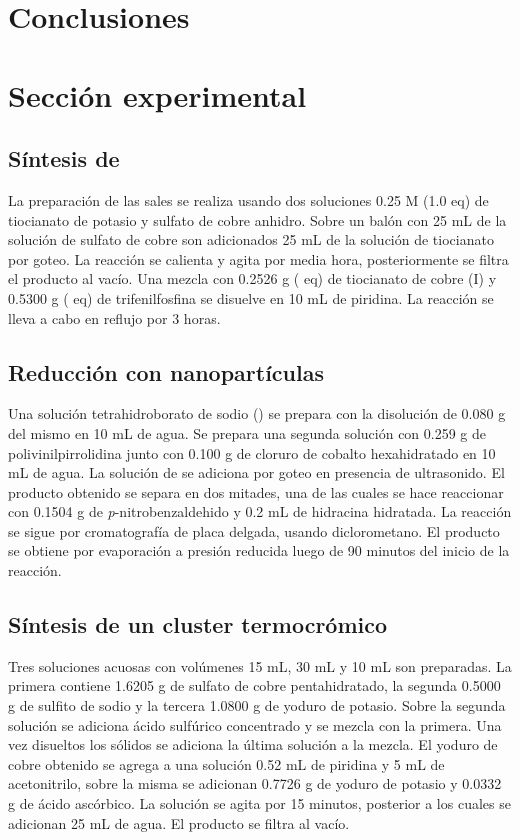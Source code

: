 \documentclass[fleqn,10pt]{SelfArx}
\begin{document}
\section{Conclusiones}

\section{Secci\'on experimental}
\subsection{S\'intesis de }
La preparaci\'on de las sales se realiza usando dos soluciones 0.25 M (1.0 eq) de tiocianato de potasio y sulfato de cobre anhidro. Sobre un bal\'on con 25 mL de la soluci\'on de sulfato de cobre son adicionados 25 mL de la soluci\'on de tiocianato por goteo. La reacci\'on se calienta y agita por media hora, posteriormente se filtra el producto al vac\'io. Una mezcla con 0.2526 g ( eq) de tiocianato de cobre (I) y 0.5300 g ( eq) de trifenilfosfina se disuelve en 10 mL de piridina. La reacci\'on se lleva a cabo en reflujo por 3 horas.

\subsection{Reducci\'on con nanopart\'iculas}
Una soluci\'on tetrahidroborato de sodio () se prepara con la disoluci\'on de 0.080 g del mismo en 10 mL de agua. Se prepara una segunda soluci\'on con 0.259 g de polivinilpirrolidina junto con 0.100 g de cloruro de cobalto hexahidratado en 10 mL de agua. La soluci\'on de  se adiciona por goteo en presencia de ultrasonido. El producto obtenido se separa en dos mitades, una de las cuales se hace reaccionar con 0.1504 g de \textit{p}-nitrobenzaldehido y 0.2 mL de hidracina hidratada. La reacci\'on se sigue por cromatograf\'ia de placa delgada, usando diclorometano. El producto se obtiene por evaporaci\'on a presi\'on reducida luego de 90 minutos del inicio de la reacci\'on.

\subsection{S\'intesis de un cluster termocr\'omico}
Tres soluciones acuosas con vol\'umenes 15 mL, 30 mL y 10 mL son preparadas. La primera contiene 1.6205 g de sulfato de cobre pentahidratado, la segunda 0.5000 g de sulfito de sodio y la tercera 1.0800 g de yoduro de potasio. Sobre la segunda soluci\'on se adiciona \'acido sulf\'urico concentrado y se mezcla con la primera. Una vez disueltos los s\'olidos se adiciona la \'ultima soluci\'on a la mezcla. El yoduro de cobre obtenido se agrega a una soluci\'on 0.52 mL de piridina y 5 mL de acetonitrilo, sobre la misma se adicionan 0.7726 g de yoduro de potasio y 0.0332 g de \'acido asc\'orbico. La soluci\'on se agita por 15 minutos, posterior a los cuales se adicionan 25 mL de agua. El producto se filtra al vac\'io.  
\end{document}
